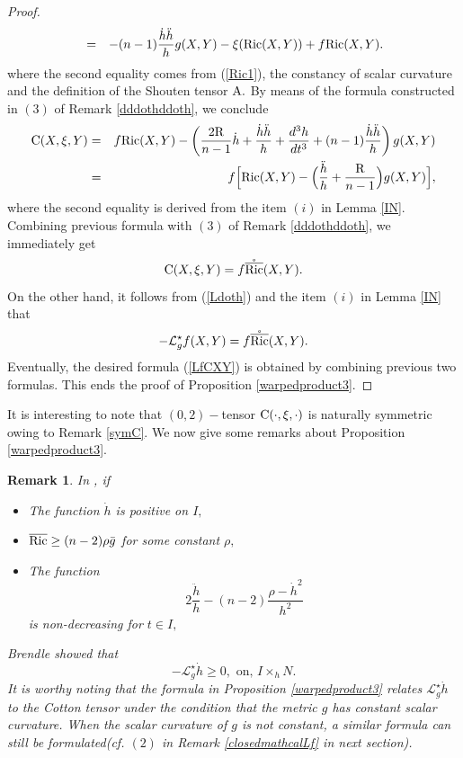 \documentclass[10pt,leqno,oneside]{amsart}
\newtheorem{Rmk}{Remark}
\begin{document}
{\begin{proof}
\begin{eqnarray*}
          &=&-(n-1)\frac{\dot{h}\ddot{h}}{h}g(X,Y)-\xi({\rm{Ric}}(X,Y))+f{\rm{Ric}}(X,Y).
         \end{eqnarray*}
         where the second equality comes from (\ref{Ric1}), the constancy of scalar curvature and the definition of the Shouten tensor ${\rm A}.$ By means of the formula constructed in $(3)$ of Remark \ref{dddothddoth}, we conclude
         \begin{eqnarray*}
          {\rm{C}}(X,\xi,Y) &=&f{\rm{Ric}}(X,Y)-\left(\frac{2{\rm{R}}}{n-1}\dot{h}+\frac{\dot{h}\ddot{h}}{h}+\frac{d^3h}{dt^3}+(n-1)\frac{\dot{h}\ddot{h}}{h}\right)g(X,Y)\\
          &=&f\Big[{\rm{Ric}}(X,Y)-\Big(\frac{\ddot{h}}{h}+\frac{{\rm{R}}}{n-1}\Big)g(X,Y)\Big],
         \end{eqnarray*}
         where the second equality is derived from the item $(i)$ in Lemma \ref{IN}. Combining previous formula with $(3)$ of Remark \ref{dddothddoth}, we immediately get
         \begin{equation*}\label{CbarRic}
           {\rm{C}}(X,\xi,Y)=f\mathring{\overline{{\rm{Ric}}}}(X,Y).
         \end{equation*}
         On the other hand, it follows from (\ref{Ldoth}) and the item $(i)$ in Lemma \ref{IN} that
         \begin{equation*}\label{LbarRic}
           -\mathcal{L}_g^{\star}f(X,Y)=f\mathring{\overline{{\rm{Ric}}}}(X,Y).
         \end{equation*}
         Eventually, the desired formula (\ref{LfCXY}) is obtained by combining previous two formulas. This ends the proof of Proposition \ref{warpedproduct3}.
    \end{proof}

         It is interesting to note that $(0,2)-$tensor ${\rm{C}}(\cdot,\xi,\cdot)$ is naturally symmetric owing to Remark \ref{symC}. We now give some remarks about Proposition \ref{warpedproduct3}.
    \begin{Rmk}
         In {\rm\cite[Proposition 2.1]{Brendle2013}}, if
         \begin{itemize}
           \item[{\rm 1)}.] The function $\dot{h}$ is positive on $I,$
           \item[{\rm 2)}.] $\overline{{\rm{Ric}}}\geq (n-2)\rho\bar{g}$ for some constant $\rho,$
           \item[{\rm 3)}.] The function
                      $$2\frac{\ddot{h}}{h}-(n-2)\frac{\rho-\dot{h}^2}{h^2}$$
                      is non-decreasing for $t\in I,$
         \end{itemize}
          Brendle showed that
         $$-\mathcal{L}_g^{\star}\dot{h}\geq0,\text{~on,~} I\times_hN .$$
         It is worthy noting that the formula in Proposition {\rm\ref{warpedproduct3}} relates $\mathcal{L}_g^{\star}\dot{h}$ to the Cotton tensor under the condition that the metric $g$ has constant scalar curvature. When the scalar curvature of $g$ is not constant, a similar formula can still be formulated(cf. $(2)$ in Remark {\rm\ref{closedmathcalLf}} in next section).
    \end{Rmk}

}
\end{document}
